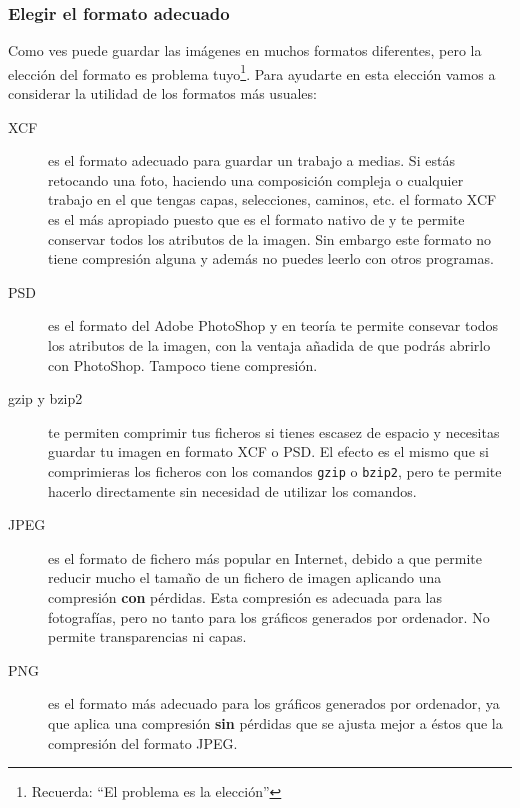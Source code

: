\subsubsection{Elegir el formato adecuado}

Como   ves    \gimp   puede    guardar   las   imágenes    en   muchos
formatos  diferentes,  pero  la   elección  del  formato  es  problema
tuyo\footnote{Recuerda: ``El problema es la elección''}. Para ayudarte
en esta  elección vamos a considerar  la utilidad de los  formatos más
usuales:

\begin{description}

\item [XCF] es  el formato adecuado para guardar un  trabajo a medias.
Si  estás retocando  una  foto, haciendo  una  composición compleja  o
cualquier trabajo en  el que tengas capas,  selecciones, caminos, etc.
el formato XCF es el más apropiado  puesto que es el formato nativo de
\gimp y  te permite conservar  todos los  atributos de la  imagen. Sin
embargo este  formato no  tiene compresión alguna  y además  no puedes
leerlo con otros programas.

\item [PSD]  es el formato  del {\sf Adobe  PhotoShop} y en  teoría te
permite  consevar todos  los atributos  de la  imagen, con  la ventaja
añadida  de que  podrás  abrirlo con  {\sf  PhotoShop}. Tampoco  tiene
compresión.

\item  [gzip y  bzip2] te  permiten comprimir  tus ficheros  si tienes
escasez de espacio y necesitas guardar tu imagen en formato XCF o PSD.
El  efecto es  el  mismo  que si  comprimieras  los  ficheros con  los
comandos  {\tt gzip}  o {\tt  bzip2},  pero \gimp  te permite  hacerlo
directamente sin necesidad de utilizar los comandos.

\item [JPEG] es el formato de  fichero más popular en Internet, debido
a  que  permite reducir  mucho  el  tamaño  de  un fichero  de  imagen
aplicando  una  compresión  {\bf  con} pérdidas.  Esta  compresión  es
adecuada  para  las  fotografías,  pero no  tanto  para  los  gráficos
generados por ordenador. No permite transparencias ni capas.

\item [PNG] es el formato más adecuado para los gráficos generados por
ordenador,  ya que  aplica una  compresión {\bf  sin} pérdidas  que se
ajusta mejor a éstos que la compresión del formato JPEG.


\end{description}
